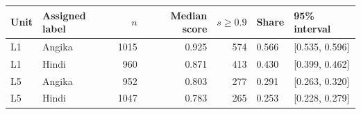 \begin{tabular}{llrrrll}
\toprule
Unit & Assigned label & $n$ & Median score & $s\geq0.9$ & Share & 95\% interval \\
\midrule
L1 & Angika & 1015 & 0.925 & 574 & 0.566 & [0.535, 0.596] \\
L1 & Hindi & 960 & 0.871 & 413 & 0.430 & [0.399, 0.462] \\
L5 & Angika & 952 & 0.803 & 277 & 0.291 & [0.263, 0.320] \\
L5 & Hindi & 1047 & 0.783 & 265 & 0.253 & [0.228, 0.279] \\
\bottomrule
\end{tabular}

